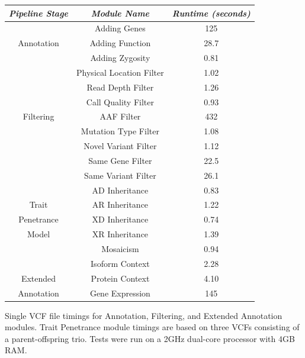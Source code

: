 \documentclass{bioinfo}
\begin{document}


\begin{table}[!t]
{\begin{tabular}{| c | *2c |} \hline %
\emph{Pipeline Stage} & \emph{Module Name} & \emph{Runtime (seconds)} \\
\hline
             & Adding Genes     & 125\\
Annotation   & Adding Function & 28.7\\
             & Adding Zygosity & 0.81\\
\hline
             & Physical Location Filter & 1.02 \\
             & Read Depth Filter        & 1.26 \\
             & Call Quality Filter      & 0.93\\
Filtering    & AAF Filter               & 432\\
             & Mutation Type Filter     & 1.08\\
             & Novel Variant Filter     & 1.12\\
             & Same Gene Filter       & 22.5\\
             & Same Variant Filter    & 26.1\\
\hline
             & AD Inheritance    & 0.83\\
 Trait       & AR Inheritance    & 1.22\\
Penetrance   & XD Inheritance    & 0.74\\
  Model      & XR Inheritance    & 1.39\\
             & Mosaicism         & 0.94\\
\hline
                 & Isoform Context      & 2.28\\
   Extended      & Protein Context      & 4.10\\
 Annotation      & Gene Expression      & 145\\
\hline
\end{tabular}}
{Single VCF file timings for Annotation, Filtering, and Extended Annotation modules. Trait Penetrance module timings are based on three VCFs consisting of a parent-offspring trio. Tests were run on a 2GHz dual-core processor with 4GB RAM.}
\end{table}
\end{document}
